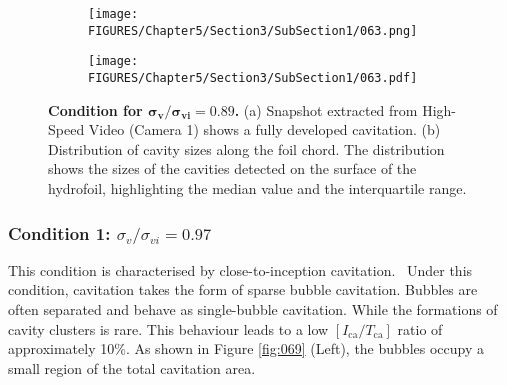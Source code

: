\begin{figure}[p]
    \centering
    \begin{subfigure}[b]{\textwidth}
        \centering
        \texttt{[image: FIGURES/Chapter5/Section3/SubSection1/063.png]}
        \captionsetup{justification=centering}
    \end{subfigure}
    \vspace{0.5cm} 
    \begin{subfigure}[b]{\textwidth}
        \centering
        \texttt{[image: FIGURES/Chapter5/Section3/SubSection1/063.pdf]}
        \captionsetup{justification=centering}
    \end{subfigure}
    \caption{\textbf{Condition for $\boldsymbol{\sigma_v / \sigma_{vi} = 0.89}$.} 
    (a) Snapshot extracted from High-Speed Video (Camera 1) shows a fully developed cavitation.
    (b) Distribution of cavity sizes along the foil chord. The distribution shows the sizes of the cavities detected on the surface of the hydrofoil, highlighting the median value and the interquartile range.}
    \label{fig:063}
\end{figure}

\subsubsection{Condition 1: $\sigma_v/\sigma_{vi} = 0.97$}
\label{sez:stereo_1}
This condition is characterised by close-to-inception cavitation.  Under this condition, cavitation takes the form of sparse bubble cavitation. Bubbles are often separated and behave as single-bubble cavitation. While the formations of cavity clusters is rare.
This behaviour leads to a low $[I_{\text{ca}} / T_{\text{ca}}]$ ratio of approximately 10\%. As shown in Figure \ref{fig:069} (Left), the bubbles occupy a small region of the total cavitation area.

